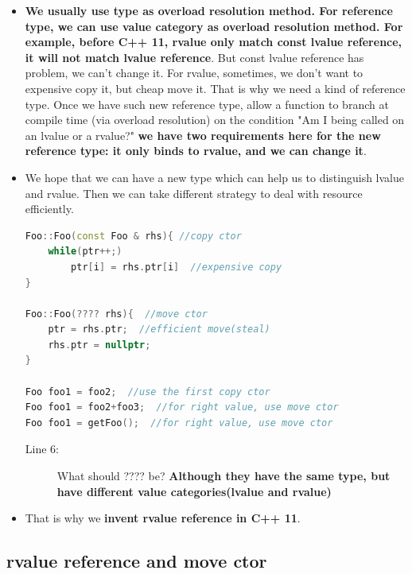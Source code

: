 \documentclass[a4paper,11pt,twoside]{book}
\begin{document}
\begin{itemize}
	\item \textbf{We usually use type as overload resolution method. For reference type, we can use value category as overload resolution method. For example, before C++ 11, rvalue only match const lvalue reference, it will not match lvalue reference}. But const lvalue reference has problem, we can't change it. For rvalue, sometimes, we don't want to expensive copy it, but cheap move it. That is why we need a kind of reference type. Once we have such new reference type,  allow a function to branch at compile time (via overload resolution) on the condition "Am I being called on an lvalue or a rvalue?" \textbf{ we have two requirements here for the new reference type: it only binds to rvalue, and we can change it}.
			
	\item We hope that we can have a new type which can help us to distinguish lvalue and rvalue. Then we can take different strategy to deal with resource efficiently.

\begin{lstlisting}[frame=single, language=c++]
Foo::Foo(const Foo & rhs){ //copy ctor
	while(ptr++;)
	    ptr[i] = rhs.ptr[i]  //expensive copy
}	

Foo::Foo(???? rhs){  //move ctor
	ptr = rhs.ptr;  //efficient move(steal)
	rhs.ptr = nullptr;
}	
	
Foo foo1 = foo2;  //use the first copy ctor
Foo foo1 = foo2+foo3;  //for right value, use move ctor
Foo foo1 = getFoo();  //for right value, use move ctor
\end{lstlisting}

\begin{description}
	\item [Line 6:]What should ???? be? \textbf{Although they have the same type, but have different value categories(lvalue and rvalue)}
\end{description}
    \item That is why we \textbf{invent rvalue reference in C++ 11}. 
\end{itemize}

\subsection{ rvalue reference and move ctor}
\end{document}
